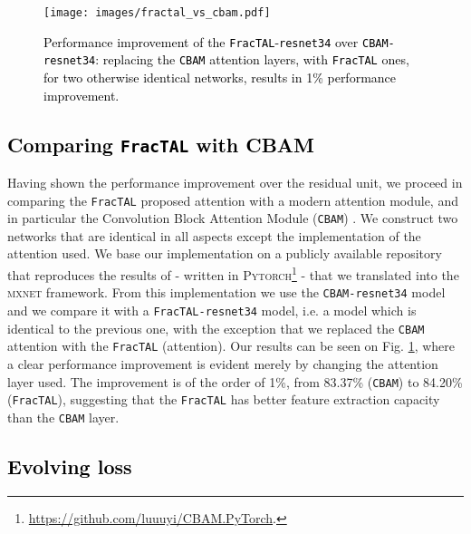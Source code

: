 \documentclass[times, 5p]{elsarticle}
\def \FracTAL {\texttt{FracTAL} }
\begin{document}
\begin{figure}
\centering
\texttt{[image: images/fractal\_vs\_cbam.pdf]}
\caption{\textcolor{black}{Performance improvement of the \texttt{FracTAL}-{\texttt{resnet34}} over \texttt{CBAM-resnet34}: replacing the \texttt{CBAM} attention layers, with \FracTAL ones, for two otherwise identical networks, results in 1\% performance improvement.}} 
\label{fractal_vs_cbam}
\end{figure}





\subsection{\textcolor{black}{Comparing \FracTAL with CBAM}}

Having shown the performance improvement over the residual unit,  we proceed in comparing the \FracTAL proposed attention with a modern attention module, and in particular the    Convolution Block Attention Module (\texttt{CBAM}) \citep{10.1007/978-3-030-01234-2_1}. 
We construct two networks that are identical in all aspects except the implementation of the attention used.  We base our implementation on a publicly available repository that reproduces the results of \cite{10.1007/978-3-030-01234-2_1} - written in \textsc{Pytorch}\footnote{\textcolor{black}{\href{https://github.com/luuuyi/CBAM.PyTorch}{https://github.com/luuuyi/CBAM.PyTorch}.}} - that we translated  into the \textsc{mxnet} framework. From this implementation we use the \texttt{CBAM-resnet34} model and we compare it with a \texttt{FracTAL-resnet34} model, i.e. a model which is identical to the previous one, with the exception that we replaced the \texttt{CBAM} attention with the \FracTAL (attention). Our results can be seen on Fig. \ref{fractal_vs_cbam}, where a clear performance improvement is evident merely by changing the attention layer used. The  improvement is of the order of 1\%, from 83.37\% (\texttt{CBAM}) to 84.20\% (\texttt{FracTAL}), suggesting that the \FracTAL has better feature extraction capacity than the \texttt{CBAM} layer.   



\subsection{\textcolor{black}{Evolving loss}}
\end{document}
